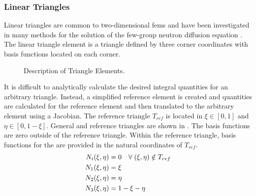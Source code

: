    \subsubsection{Linear Triangles}
      Linear triangles are common to two-dimensional \glspl{fem} and have been
      investigated in many methods for the solution of the few-group neutron
      diffusion equation \cite{Hosseini2017,Hosseini2013,Hosseini2015,Ryu2013}.
      The linear triangle element is a triangle defined by three corner
      coordinates with basis functions located on each corner. 

      \begin{figure}
        \centering
        \vspace{0.2in}
        \caption{Description of Triangle Elements.}
        \label{fig:triangle_elements}
      \end{figure}

      It is difficult to analytically calculate the desired integral quantities
      for an arbitrary triangle. Instead, a simplified reference element is
      created and quantities are calculated for the reference element and then
      translated to the arbitrary element using a Jacobian.  The reference
      triangle $T_{ref}$ is located in $\xi \in [0,1]$ and $\eta \in [0,1-\xi]$.
      General and reference triangles are shown in .
      The basis functions are zero outside of the reference triangle. Within
      the reference triangle, basis functions for the are provided in the
      natural coordinates of $T_{ref}$.
      \begin{align}
        N_i(\xi,\eta) &= 0 \quad \forall \; (\xi,\eta) \notin T_{ref} \\
        N_1(\xi,\eta) &= \xi \\
        N_2(\xi,\eta) &= \eta \\
        N_3(\xi,\eta) &= 1-\xi-\eta
      \end{align}
      
